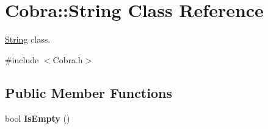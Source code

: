\hypertarget{class_cobra_1_1_string}{\section{Cobra\+:\+:String Class Reference}
\label{class_cobra_1_1_string}
}


\hyperlink{class_cobra_1_1_string}{String} class.  




{\ttfamily \#include $<$Cobra.\+h$>$}

\subsection*{Public Member Functions}
\begin{DoxyCompactItemize}
\item 
\hypertarget{class_cobra_1_1_string_a28966ab4456546de7da2eedb5663e3da}{bool {\bfseries Is\+Empty} ()}\label{class_cobra_1_1_string_a28966ab4456546de7da2eedb5663e3da}

\end{DoxyCompactItemize}
